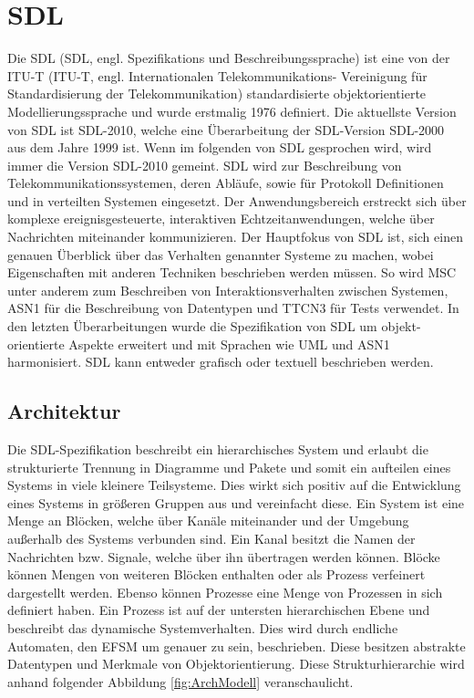 \section{\acf{SDL}}
\label{sc:SDL}
Die \ac{SDL} (\ac{SDL}, engl. Spezifikations und Beschreibungssprache) ist eine von der \ac{ITU-T} (\ac{ITU-T}, engl. Internationalen 
Telekommunikations- Vereinigung für Standardisierung der Telekommunikation) standardisierte objektorientierte Modellierungssprache und wurde erstmalig 
1976 definiert. Die aktuellste Version von \ac{SDL} ist \ac{SDL}-2010, welche eine Überarbeitung der \ac{SDL}-Version \ac{SDL}-2000 aus dem Jahre 
1999 ist. Wenn im folgenden von \ac{SDL} gesprochen wird, wird immer die Version \acs{SDL}-2010 gemeint. 
\ac{SDL} wird zur Beschreibung von Telekommunikationssystemen, deren Abläufe, sowie für Protokoll Definitionen und in verteilten Systemen eingesetzt.
Der Anwendungsbereich erstreckt sich über komplexe ereignisgesteuerte, interaktiven Echtzeitanwendungen, welche über Nachrichten miteinander kommunizieren. 
Der Hauptfokus von \ac{SDL} ist, sich einen genauen Überblick über das Verhalten genannter Systeme zu machen, wobei Eigenschaften mit anderen Techniken beschrieben werden müssen. 
So wird \ac{MSC} unter anderem zum Beschreiben von Interaktionsverhalten zwischen Systemen, \ac{ASN1} für die Beschreibung von Datentypen und \ac{TTCN3} für Tests verwendet. In den letzten Überarbeitungen wurde die Spezifikation von \ac{SDL} um objekt-orientierte Aspekte erweitert und mit Sprachen wie \ac{UML} und \ac{ASN1} harmonisiert. \ac{SDL} kann entweder grafisch oder textuell beschrieben werden.


\subsection{Architektur}
\label{ssc:Architektur}
Die \ac{SDL}-Spezifikation beschreibt ein hierarchisches System und erlaubt die strukturierte Trennung in Diagramme und Pakete und somit ein aufteilen eines Systems in viele kleinere Teilsysteme. Dies wirkt sich positiv auf die Entwicklung eines Systems in größeren Gruppen aus und vereinfacht diese. Ein System ist eine Menge an Blöcken, welche über Kanäle miteinander und der Umgebung außerhalb des Systems verbunden sind. Ein Kanal besitzt die Namen der Nachrichten bzw. Signale, welche über ihn übertragen werden können. Blöcke können Mengen von weiteren Blöcken enthalten oder  als Prozess verfeinert dargestellt werden. Ebenso können Prozesse eine Menge von Prozessen in sich definiert haben.
Ein Prozess ist auf der untersten hierarchischen Ebene und beschreibt das dynamische Systemverhalten. Dies wird durch endliche Automaten, den \ac{EFSM} um genauer zu sein, beschrieben. Diese besitzen abstrakte Datentypen und Merkmale von Objektorientierung. Diese Strukturhierarchie wird anhand folgender Abbildung \ref{fig:ArchModell} veranschaulicht.
 
